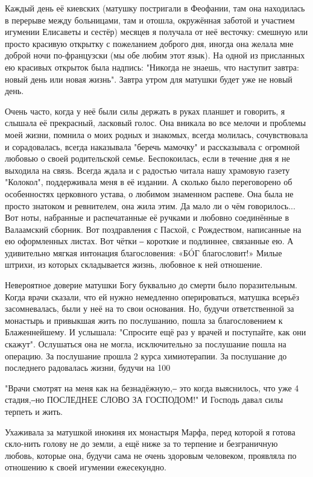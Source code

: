 Каждый день её киевских (матушку постригали в Феофании, там она находилась в
перерыве между больницами, там и отошла, окружённая заботой и участием игумении
Елисаветы и сестёр) месяцев я получала от неё весточку: смешную или просто
красивую открытку с пожеланием доброго дня, иногда она желала мне доброй ночи
по-французски (мы обе любим этот язык). На одной из присланных ею  красивых
открыток была надпись: "Никогда не знаешь, что наступит завтра: новый день или
новая жизнь". Завтра утром для матушки будет уже не новый день. 

 Очень часто, когда у неё были силы держать в руках планшет и говорить, я
 слышала её прекрасный, ласковый голос. Она вникала во все мелочи и проблемы
 моей жизни, помнила о моих родных и знакомых, всегда молилась, сочувствовала и
 сорадовалась, всегда наказывала "беречь мамочку" и рассказывала с огромной
 любовью о своей родительской семье. Беспокоилась, если в течение дня я не
 выходила на связь. Всегда ждала и с радостью читала нашу храмовую газету
 "Колокол", поддерживала меня в её издании. А сколько было переговорено об
 особенностях церковного устава, о любимом знаменном распеве. Она была не
 просто знатоком и ревнителем, она жила этим. Да мало ли о чём говорилось...
 Вот ноты, набранные и распечатанные её ручками и любовно соединённые в
 Валаамский сборник. Вот поздравления с Пасхой, с Рождеством, написанные на ею
 оформленных листах. Вот чётки ‒ короткие и подлиннее, связанные ею. А
 удивительно мягкая интонация благословения: «БÓГ благословит!» Милые штрихи,
 из которых складывается жизнь, любовное к ней отношение.

 Невероятное доверие матушки Богу буквально до смерти было поразительным. Когда
 врачи сказали, что ей нужно немедленно оперироваться, матушка всерьёз
 засомневалась, были у неё на то свои основания. Но, будучи ответственной за
 монастырь и привыкшая жить по послушанию, пошла за благословением к
 Блаженнейшему. И услышала: "Спросите ещё раз у врачей и поступайте, как они
 скажут". Ослушаться она не могла, исключительно за послушание пошла на
 операцию. За послушание прошла 2 курса химиотерапии. За послушание до
 последнего радовалась жизни, будучи на 100%

"Врачи смотрят на меня как на безнадёжную,‒ это когда выяснилось, что уже 4
стадия,‒но ПОСЛЕДНЕЕ СЛОВО ЗА ГОСПОДОМ!" И Господь давал силы терпеть и жить.

Ухаживала за матушкой инокиня их монастыря Марфа, перед которой я готова
скло-нить голову не до земли, а ещё ниже за то терпение и безграничную любовь,
которые она, будучи сама не очень здоровым человеком, проявляла по отношению к
своей игумении ежесекундно. 

